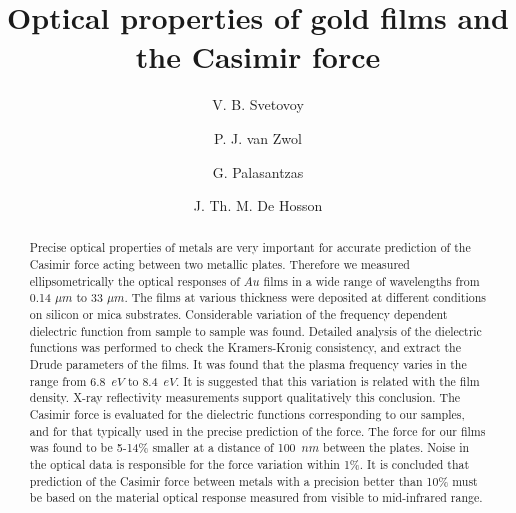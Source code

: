 \documentclass[prb]{revtex4}%
\begin{document}

\title{Optical properties of gold films and the Casimir force}

\author{V. B. Svetovoy}
\author{P. J. van Zwol}
\author{G. Palasantzas}
\author{J. Th. M. De Hosson}




\begin{abstract}
Precise optical properties of metals are very important for accurate
prediction of the Casimir force acting between two metallic plates.
Therefore we measured ellipsometrically the optical responses of
$Au$ films in a wide range of wavelengths from 0.14 $\mu m$ to 33
$\mu m$. The films at various thickness were deposited at different
conditions on silicon or mica substrates. Considerable variation of
the frequency dependent dielectric function from sample to sample
was found. Detailed analysis of the dielectric functions was
performed to check the Kramers-Kronig consistency, and extract the
Drude parameters of the films. It was found that the plasma
frequency varies in the range from 6.8~$eV$ to 8.4~$eV$. It is
suggested that this variation is related with the film density.
X-ray reflectivity measurements support qualitatively this
conclusion. The Casimir force is evaluated for the dielectric
functions corresponding to our samples, and for that typically used
in the precise prediction of the force. The force for our films was
found to be 5-14\% smaller at a distance of 100~$nm$ between the
plates. Noise in the optical data is responsible for the force
variation within 1\%. It is concluded that prediction of the Casimir
force between metals with a precision better than 10\% must be based
on the material optical response measured from visible to
mid-infrared range.
\end{abstract}
\end{document}
